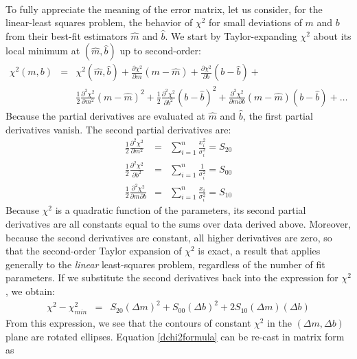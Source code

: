 \documentclass{article}
\begin{document}
\paragraph{}
To fully appreciate the meaning of the error matrix, let us consider, for the linear-least squares problem, the behavior of $\chi^2$ for small deviations of $m$ and $b$ from their best-fit estimators $\hat{m}$ and $\hat{b}$. We start by Taylor-expanding $\chi^2$ about its local minimum at $(\hat{m}, \hat{b})$ up to second-order:
\begin{eqnarray}
  \chi^2(m,b) &=& \chi^2(\hat{m},\hat{b}) + \frac{\partial \chi^2}{\partial m} (m - \hat{m}) + \frac{\partial \chi^2}{\partial b} (b - \hat{b}) + \nonumber \\
  & & \frac{1}{2}\frac{\partial^2 \chi^2}{\partial m^2} (m - \hat{m})^2 + \frac{1}{2} \frac{\partial^2 \chi^2}{\partial b^2} (b-\hat{b})^2 + \frac{\partial^2 \chi^2}{\partial m \partial b} (m - \hat{m})(b-\hat{b}) + \ldots \label{chi2taylorexpand}
\end{eqnarray}
Because the partial derivatives are evaluated at $\hat{m}$ and $\hat{b}$, the first partial derivatives vanish. The second partial derivatives are:
\begin{eqnarray}
  \frac{1}{2} \frac{\partial^2 \chi^2}{\partial m^2} &=&  \sum_{i=1}^{n} \frac{x_i^2}{\sigma_i^2} = S_{20} \\
  \frac{1}{2} \frac{\partial^2 \chi^2}{\partial b^2} &=& \sum_{i=1}^{n} \frac{1}{\sigma_i^2} = S_{00} \\
  \frac{1}{2} \frac{\partial^2 \chi^2}{\partial m \partial b} &=& \sum_{i=1}^{n} \frac{x_i}{\sigma_i^2} = S_{10} 
\end{eqnarray}
Because $\chi^2$ is a quadratic function of the parameters, its second partial derivatives are all constants equal to the sums over data derived above. Moreover, because the second derivatives are constant, all higher derivatives are zero, so that the second-order Taylor expansion of $\chi^2$ is exact, a result that applies generally to the \emph{linear} least-squares problem, regardless of the number of fit parameters. If we substitute the second derivatives back into the expression for $\chi^2$, we obtain:
\begin{eqnarray}
  \chi^2 - \chi^2_{min} &=& S_{20} (\Delta m)^2 + S_{00} (\Delta b)^2 + 2S_{10} (\Delta m)(\Delta b) \label{dchi2formula}
\end{eqnarray}
From this expression, we see that the contours of constant $\chi^2$ in the $(\Delta m, \Delta b)$ plane are rotated ellipses. Equation \eqref{dchi2formula} can be re-cast in matrix form as 
\end{document}
